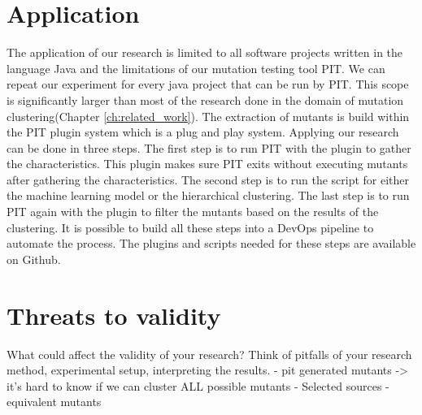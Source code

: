\documentclass[../main]{subfiles}
\begin{document}
\section{Application}
The application of our research is limited to all software projects written in the language Java and the limitations of our mutation testing tool PIT\cite{pit}.
We can repeat our experiment for every java project that can be run by PIT.
This scope is significantly larger than most of the research done in the domain of mutation clustering(Chapter \ref{ch:related_work}).
The extraction of mutants is build within the PIT plugin system which is a plug and play system.
Applying our research can be done in three steps.
The first step is to run PIT with the plugin to gather the characteristics.
This plugin makes sure PIT exits without executing mutants after gathering the characteristics.
The second step is to run the script for either the machine learning model or the hierarchical clustering.
The last step is to run PIT again with the plugin to filter the mutants based on the results of the clustering.
It is possible to build all these steps into a DevOps pipeline to automate the process. 
The plugins and scripts needed for these steps are available on Github\cite{rbasarat-repo}.

\section{Threats to validity}
What could affect the validity of your research? Think of pitfalls of your research method, experimental setup, interpreting the results.
- pit generated mutants -> it's hard to know if we can cluster ALL possible mutants
- Selected sources
- equivalent mutants
\end{document}
